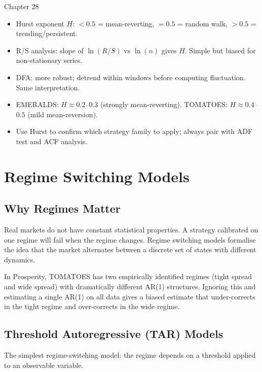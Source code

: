 \documentclass[12pt,a4paper,openany]{report}
\theoremstyle{definition}
\begin{document}
\begin{takeawaybox}{Chapter 28}
\begin{itemize}
  \item Hurst exponent $H$: $< 0.5$ = mean-reverting, $= 0.5$ = random walk, $> 0.5$ = trending/persistent.
  \item R/S analysis: slope of $\ln(R/S)$ vs $\ln(n)$ gives $H$. Simple but biased for non-stationary series.
  \item DFA: more robust; detrend within windows before computing fluctuation. Same interpretation.
  \item EMERALDS: $H \approx 0.2$--$0.3$ (strongly mean-reverting). TOMATOES: $H \approx 0.4$--$0.5$ (mild mean-reversion).
  \item Use Hurst to confirm which strategy family to apply; always pair with ADF test and ACF analysis.
\end{itemize}
\end{takeawaybox}


\chapter{Regime Switching Models}

\section{Why Regimes Matter}

Real markets do not have constant statistical properties. A strategy calibrated on one regime will fail when the regime changes. Regime switching models formalise the idea that the market alternates between a discrete set of states with different dynamics.

In Prosperity, TOMATOES has two empirically identified regimes (tight spread and wide spread) with dramatically different AR(1) structures. Ignoring this and estimating a single AR(1) on all data gives a biased estimate that under-corrects in the tight regime and over-corrects in the wide regime.

\section{Threshold Autoregressive (TAR) Models}

The simplest regime-switching model: the regime depends on a threshold applied to an observable variable.
\end{document}
